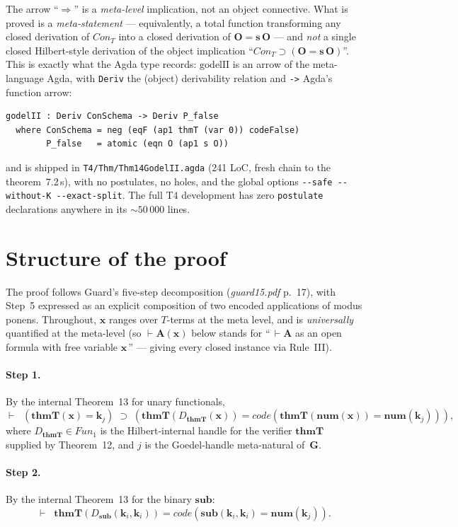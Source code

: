 \documentclass[11pt]{article}
\theoremstyle{plain}
\theoremstyle{definition}
\theoremstyle{remark}
\newcommand{\code}[1]{\mathit{code}(#1)}
\newcommand{\sub}{\mathbf{sub}}
\newcommand{\thmT}{\mathbf{thmT}}
\newcommand{\num}{\mathbf{num}}
\newcommand{\Fun}{\mathit{Fun}}
\newcommand{\Con}{\mathit{Con}}
\begin{document}
\noindent
The arrow ``$\Longrightarrow$'' is a \emph{meta-level} implication, not an
object connective.  What is proved is a \emph{meta-statement} ---
equivalently, a total function transforming any closed derivation of
$\Con_T$ into a closed derivation of $\mathbf{O} = \mathbf{s}\,\mathbf{O}$
--- and \emph{not} a single closed Hilbert-style derivation of the object
implication ``$\Con_T \supset (\mathbf{O} = \mathbf{s}\,\mathbf{O})$''.
This is exactly what the Agda type records: $\mathrm{godelII}$ is an arrow
of the meta-language Agda, with \texttt{Deriv} the (object) derivability
relation and \verb|->| Agda's function arrow:
\begin{lstlisting}
godelII : Deriv ConSchema -> Deriv P_false
  where ConSchema = neg (eqF (ap1 thmT (var 0)) codeFalse)
        P_false   = atomic (eqn O (ap1 s O))
\end{lstlisting}
and is shipped in \verb|T4/Thm/Thm14GodelII.agda| (241 LoC, fresh
chain to the theorem~$7.2$\,s), with no postulates, no holes, and the
global options \verb|--safe --without-K --exact-split|.  The full T4
development has zero \verb|postulate| declarations anywhere in its
$\sim 50\,000$ lines.

\section{Structure of the proof}

The proof follows Guard's five-step decomposition (\emph{guard15.pdf}
p.~17), with Step~5 expressed as an explicit composition of two encoded
applications of modus ponens.  Throughout, $\mathbf{x}$ ranges over
$T$-terms at the meta level, and is \emph{universally} quantified at
the meta-level (so $\vdash \mathbf{A}(\mathbf{x})$ below stands for
``\,$\vdash \mathbf{A}$ as an open formula with free variable
$\mathbf{x}$\,'' --- giving every closed instance via Rule~III).

\paragraph{Step 1.}  By the internal Theorem~13 for unary functionals,
\[
\vdash \;\;(\thmT(\mathbf{x}) = \mathbf{k}_j) \;\supset\; (\thmT(D_\thmT(\mathbf{x})) = \code{\thmT(\num(\mathbf{x})) = \num(\mathbf{k}_j)}),
\]
where $D_\thmT \in \Fun_1$ is the Hilbert-internal handle for the
verifier $\thmT$ supplied by Theorem~12, and $j$ is the Goedel-handle
meta-natural of~$\mathbf{G}$.

\paragraph{Step 2.}  By the internal Theorem~13 for the binary
$\sub$:
\[
\vdash \;\;\thmT(D_\sub(\mathbf{k}_i, \mathbf{k}_i)) = \code{\sub(\mathbf{k}_i, \mathbf{k}_i) = \num(\mathbf{k}_j)}.
\]
\end{document}
